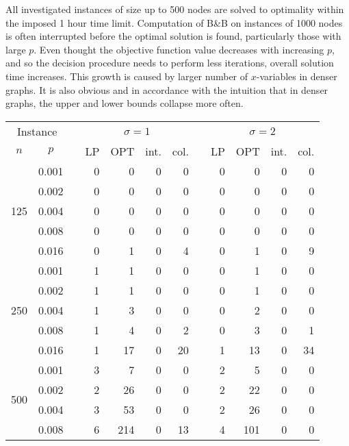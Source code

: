 All investigated instances of size up to 500 nodes are solved to optimality within the imposed 1 hour time limit.
Computation of B\&B on instances of 1000 nodes is often interrupted before the optimal solution is found, particularly those with large $p$.
Even thought the objective function value decreases with increasing $p$, and so the decision procedure needs to perform less iterations, overall solution time increases.
This growth is caused by larger number of $x$-variables in denser graphs.
It is also obvious and in accordance with the intuition that in denser graphs, the upper and lower bounds collapse more often.

\begin{table}[]
\begin{tabular}{ccrrrrrrrrrr}
\multicolumn{2}{c}{Instance} & & \multicolumn{4}{c}{$\sigma=1$} & &\multicolumn{4}{c}{$\sigma=2$} \\
\cline{1-2}\cline{4-7}\cline{9-12}
$n$ & $p$ & & LP  & OPT & int. & col.& & LP  & OPT & int. & col. \\
\hline
\multirow{5}{*}{125}       
 & 0.001 & &0   &  0 & 0 & 0 & & 0  &  0 &  0  &  0 \\ 
 & 0.002 & &0   &  0 & 0 & 0 & & 0  &  0 &  0  &  0 \\
 & 0.004 & &0   &  0 & 0 & 0 & & 0  &  0 &  0  &  0 \\
 & 0.008 & &0   &  0 & 0 & 0 & & 0  &  0 &  0  &  0 \\
 & 0.016 & &0   &  1 & 0 & 4 & & 0  &  1 &  0  &  9 \\
\hline                         
\multirow{5}{*}{250}                               
 & 0.001 & & 1  &  1 & 0 & 0 & & 0  &  1 & 0   & 0  \\
 & 0.002 & & 1  &  1 & 0 & 0 & & 0  &  1 & 0   & 0  \\
 & 0.004 & & 1  &  3 & 0 & 0 & & 0  &  2 & 0   & 0  \\
 & 0.008 & & 1  &  4 & 0 & 2 & & 0  &  3 & 0   & 1  \\
 & 0.016 & & 1  & 17 & 0 &20 & & 1  & 13 & 0   &34  \\
\hline                         
\multirow{5}{*}{500}                               
 & 0.001 & & 3   &  7 & 0 & 0 & & 2  &  5 & 0   & 0  \\
 & 0.002 & & 2   & 26 & 0 & 0 & & 2  & 22 & 0   & 0  \\
 & 0.004 & & 3   & 53 & 0 & 0 & & 2  & 26 & 0   & 0  \\
 & 0.008 & & 6   &214 & 0 &13 & & 4  &101 & 0   & 0  \\

\end{tabular}
\end{table}
